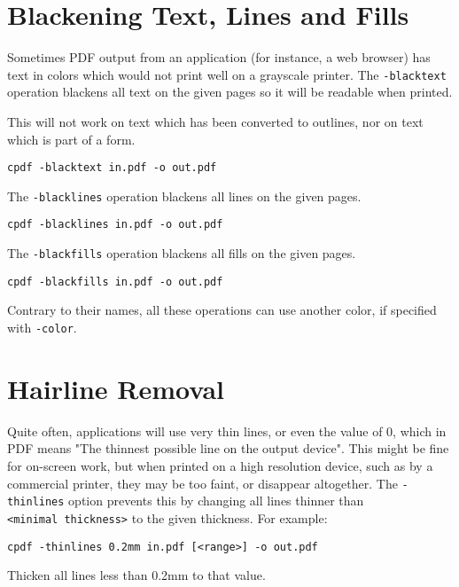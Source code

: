 \documentclass{book}
\begin{document}
  \section{Blackening Text, Lines and Fills}
  Sometimes PDF output from an application (for instance, a web browser) has
text in colors which would not print well on a grayscale printer. The
\texttt{-blacktext} operation blackens all text on the given pages so it will be readable
when printed.

  This will not work on text which has been converted to outlines, nor on text
which is part of a form.
  \begin{framed}
    \small\verb!cpdf -blacktext in.pdf -o out.pdf!
  \end{framed}


\noindent The \texttt{-blacklines} operation blackens all lines on the given pages.

  \begin{framed}
    \small\verb!cpdf -blacklines in.pdf -o out.pdf!
  \end{framed}


\noindent The \texttt{-blackfills} operation blackens all fills on the given pages.

  \begin{framed}
    \small\verb!cpdf -blackfills in.pdf -o out.pdf!
  \end{framed}

\noindent Contrary to their names, all these operations can use another color, if specified with \texttt{-color}.

  \section{Hairline Removal}
  Quite often, applications will use very thin lines, or even the value of 0,
which in PDF means "The thinnest possible line on the output device". This
might be fine for on-screen work, but when printed on a high resolution device,
such as by a commercial printer, they may be too faint, or disappear
altogether. The \texttt{-thinlines} option prevents this by changing all lines
thinner than \texttt{<minimal~thickness>} to the given thickness. For example:
  \begin{framed}
  \small\noindent\verb!cpdf -thinlines 0.2mm in.pdf [<range>] -o out.pdf!

  \vspace{2.5mm}
  \noindent Thicken all lines less than 0.2mm to that value.
  \end{framed} 
\end{document}
